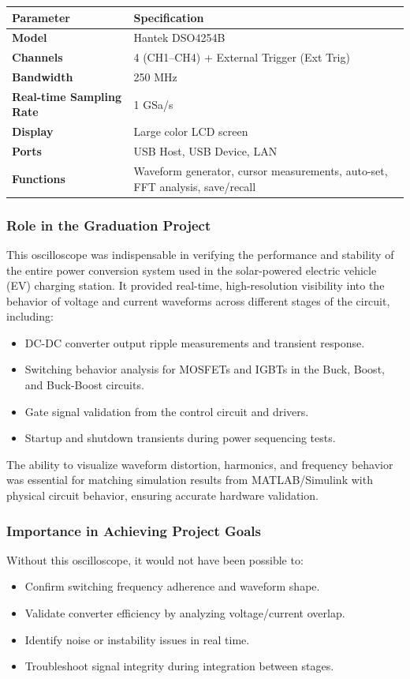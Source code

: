 \begin{tabularx}{\textwidth}{>{\bfseries}l X} %
    \toprule
    Parameter & Specification \\
    \midrule
    Model & Hantek DSO4254B \\
    Channels & 4 (CH1--CH4) + External Trigger (Ext Trig) \\
    Bandwidth & 250 MHz \\
    Real-time Sampling Rate & 1 GSa/s \\
    Display & Large color LCD screen \\
    Ports & USB Host, USB Device, LAN \\
    Functions & Waveform generator, cursor measurements, auto-set, FFT analysis, save/recall \\
    \bottomrule
\end{tabularx}

\subsubsection{Role in the Graduation Project}
This oscilloscope was indispensable in verifying the performance and stability of the entire power conversion system used in the solar-powered electric vehicle (EV) charging station. It provided real-time, high-resolution visibility into the behavior of voltage and current waveforms across different stages of the circuit, including:
\begin{itemize}
    \item DC-DC converter output ripple measurements and transient response.
    \item Switching behavior analysis for MOSFETs and IGBTs in the Buck, Boost, and Buck-Boost circuits.
    \item Gate signal validation from the control circuit and drivers.
    \item Startup and shutdown transients during power sequencing tests.
\end{itemize}
The ability to visualize waveform distortion, harmonics, and frequency behavior was essential for matching simulation results from MATLAB/Simulink with physical circuit behavior, ensuring accurate hardware validation.

\subsubsection{Importance in Achieving Project Goals}
Without this oscilloscope, it would not have been possible to:
\begin{itemize}
    \item Confirm switching frequency adherence and waveform shape.
    \item Validate converter efficiency by analyzing voltage/current overlap.
    \item Identify noise or instability issues in real time.
    \item Troubleshoot signal integrity during integration between stages.
\end{itemize}

